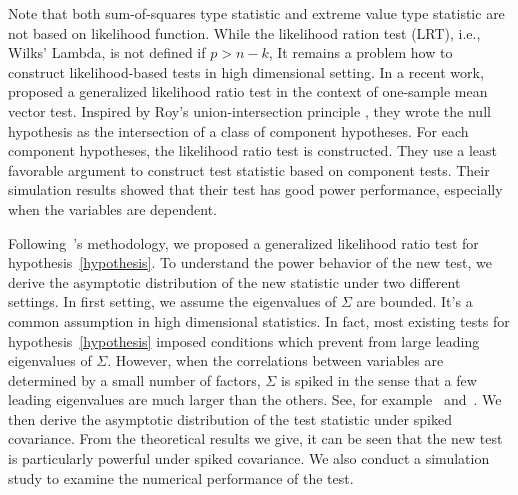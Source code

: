 \documentclass[12pt]{article} %
\theoremstyle{definition}
\begin{document}
   Note that both sum-of-squares type statistic and extreme value type statistic are not based on likelihood function.
    While the likelihood ration test (LRT), i.e., Wilks' Lambda, is not defined if $p>n-k$,
    It remains a problem how to construct likelihood-based tests in high dimensional setting.
    In a recent work,~\cite{Zhao2016A} proposed a generalized likelihood ratio test in the context of one-sample mean vector test.
Inspired by Roy's union-intersection principle \citep{Roy1953},
    they wrote the null hypothesis as the intersection of a class of component hypotheses.
    For each component hypotheses, the likelihood ratio test is constructed.
    They use a least favorable argument to construct test statistic based on component tests.
    Their simulation results showed that their test has good power performance, especially when the variables are dependent.

    Following~\cite{Zhao2016A}'s methodology, we proposed a generalized likelihood ratio test for hypothesis~\eqref{hypothesis}.
    To understand the power behavior of the new test, we derive the asymptotic distribution of the new statistic under two different settings.
    In first setting, we assume the eigenvalues of $\Sigma$ are bounded.
    It's a common assumption in high dimensional statistics.
    In fact, most existing tests for hypothesis~\eqref{hypothesis} imposed conditions which prevent from large leading eigenvalues of $\Sigma$.
    However, when the correlations between variables are determined by a small number of factors, $\Sigma$ is spiked in the sense that a few leading eigenvalues are much larger than the others.
    See, for example~\cite{Cai2012Sparse} and~\cite{Shen2013Consistency}.
    We then derive the asymptotic distribution of the test statistic under spiked covariance.
    From the theoretical results we give, it can be seen that the new test is particularly powerful under spiked covariance.
    We also conduct a simulation study to examine the numerical performance of the test.
\end{document}
